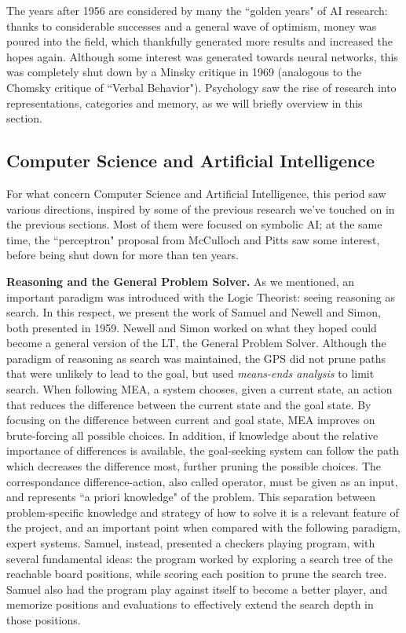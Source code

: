 \documentclass[../main.tex]{subfiles}
\begin{document}
The years after 1956 are considered by many the ``golden years" of AI research: thanks to considerable successes and a general wave of optimism, money was poured into the field, which thankfully generated more results and increased the hopes again. Although some interest was generated towards neural networks, this was completely shut down by a Minsky critique in 1969 (analogous to the Chomsky critique of ``Verbal Behavior"). Psychology saw the rise of research into representations, categories and memory, as we will briefly overview in this section.

\subsection{Computer Science and Artificial Intelligence}
For what concern Computer Science and Artificial Intelligence, this period saw various directions, inspired by some of the previous research we've touched on in the previous sections. Most of them were focused on symbolic AI; at the same time, the ``perceptron" proposal from McCulloch and Pitts saw some interest, before being shut down for more than ten years.

\vspace{4pt}
\textbf{Reasoning and the General Problem Solver.}
As we mentioned, an important paradigm was introduced with the Logic Theorist: seeing reasoning as search. In this respect, we present the work of Samuel and Newell and Simon, both presented in 1959. Newell and Simon worked on what they hoped could become a general version of the LT, the General Problem Solver. Although the paradigm of reasoning as search was maintained, the GPS did not prune paths that were unlikely to lead to the goal, but used \textit{means-ends analysis} to limit search. When following MEA, a system chooses, given a current state, an action that reduces the difference between the current state and the goal state. By focusing on the difference between current and goal state, MEA improves on brute-forcing all possible choices. In addition, if knowledge about the relative importance of differences is available, the goal-seeking system can follow the path which decreases the difference most, further pruning the possible choices. The correspondance difference-action, also called operator, must be given as an input, and represents ``a priori knowledge" of the problem. This separation between problem-specific knowledge and strategy of how to solve it is a relevant feature of the project, and an important point when compared with the following paradigm, expert systems. Samuel, instead, presented a checkers playing program, with several fundamental ideas: the program worked by exploring a search tree of the reachable board positions, while scoring each position to prune the search tree. Samuel also had the program play against itself to become a better player, and memorize positions and evaluations to effectively extend the search depth in those positions.
\end{document}
